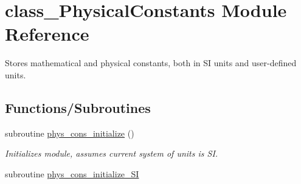 \hypertarget{namespaceclass__PhysicalConstants}{
\section{class\_\-PhysicalConstants Module Reference}
\label{namespaceclass__PhysicalConstants}
}


Stores mathematical and physical constants, both in SI units and user-\/defined units.  


\subsection*{Functions/Subroutines}
\begin{DoxyCompactItemize}
\item 
subroutine \hyperlink{namespaceclass__PhysicalConstants_a12646466fa3b6eb776e5be6f53b5eb5b}{phys\_\-cons\_\-initialize} ()
\begin{DoxyCompactList}\small\item\em Initializes module, assumes current system of units is SI. \item\end{DoxyCompactList}\item 
subroutine \hyperlink{namespaceclass__PhysicalConstants_a60f39db2f3075d17f5e1b47ed02ad092}{phys\_\-cons\_\-initialize\_\-SI}
\end{DoxyCompactItemize}
